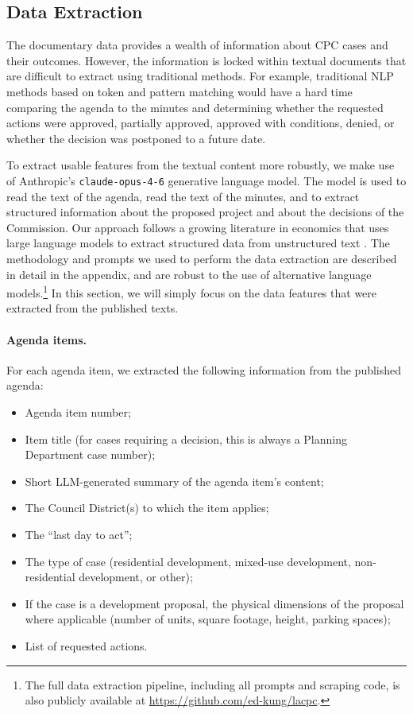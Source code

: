 \subsection{Data Extraction}

The documentary data provides a wealth of information about CPC cases and their outcomes. However, the information is locked within textual documents that are difficult to extract using traditional methods. For example, traditional NLP methods based on token and pattern matching would have a hard time comparing the agenda to the minutes and determining whether the requested actions were approved, partially approved, approved with conditions, denied, or whether the decision was postponed to a future date. 

To extract usable features from the textual content more robustly, we make use of Anthropic's \texttt{claude-opus-4-6} generative language model. The model is used to read the text of the agenda, read the text of the minutes, and to extract structured information about the proposed project and about the decisions of the Commission. Our approach follows a growing literature in economics that uses large
language models to extract structured data from unstructured text
\citep[e.g.,][]{ash2023text, korinek2023generative, ziems2024can, dell2025deep}. The methodology and prompts we used to perform the data extraction are described in detail in the appendix, and are robust to the use of alternative language models.\footnote{The full data extraction pipeline, including all prompts and scraping code, is also publicly available at \url{https://github.com/ed-kung/lacpc}.}  In this section, we will simply focus on the data features that were extracted from the published texts.

\paragraph{Agenda items.} For each agenda item, we extracted the following information from the published agenda: 
\begin{itemize}[noitemsep, topsep=0pt]
\item Agenda item number;
\item Item title (for cases requiring a decision, this is always a Planning Department case number);
\item Short LLM-generated summary of the agenda item's content;
\item The Council District(s) to which the item applies;
\item The ``last day to act'';
\item The type of case (residential development, mixed-use development, non-residential development, or other);
\item If the case is a development proposal, the physical dimensions of the proposal where applicable (number of units, square footage, height, parking spaces);
\item List of requested actions.
\end{itemize}

